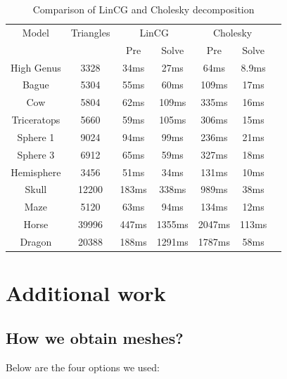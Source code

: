\documentclass[a4paper,12pt,twoside]{article}
\begin{document}
\begin{table}[htb]
\centering
\begin{tabular}{|c|c|c|c|c|c|c|}
  \hline
  
  
  Model & Triangles & \multicolumn{2}{c|}{LinCG} & \multicolumn{2}{c|}{Cholesky} \\
  \cline{3-6}
  & & Pre & Solve & Pre & Solve \\
  \hline\hline
  
  High Genus & 3328 & 34ms & 27ms & 64ms & 8.9ms \\
  Bague & 5304 & 55ms & 60ms & 109ms & 17ms  \\
  Cow & 5804 & 62ms & 109ms & 335ms & 16ms \\
  Triceratops & 5660 & 59ms & 105ms & 306ms & 15ms \\
  Sphere 1 & 9024 & 94ms & 99ms & 236ms & 21ms \\
  Sphere 3 & 6912 & 65ms & 59ms & 327ms & 18ms \\
  Hemisphere & 3456 & 51ms & 34ms & 131ms & 10ms \\
  Skull & 12200 & 183ms & 338ms & 989ms & 38ms \\
  Maze & 5120 & 63ms & 94ms & 134ms & 12ms \\
  Horse & 39996 & 447ms & 1355ms & 2047ms & 113ms \\
  Dragon & 20388 & 188ms & 1291ms & 1787ms & 58ms \\
  \hline
\end{tabular}
\caption{Comparison of LinCG and Cholesky decomposition}
\end{table}


\section{Additional work}

\subsection{How we obtain meshes?}
Below are the four options we used:
\end{document}
